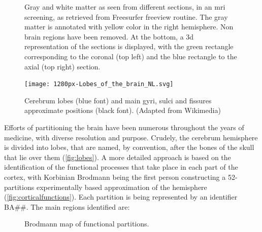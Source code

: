 \begin{figure}[H]
	\begin{minipage}{.5\linewidth}
	\centering
	\end{minipage}%
	\begin{minipage}{.5\linewidth}
	\centering
	\end{minipage}\par\medskip
	\centering
	\caption[\Ac{mri} screening of gray and white matter]{Gray and white matter as seen from different sections, in an \ac{mri} screening, as retrieved from Freesurfer freeview routine. The gray matter is annotated with yellow color in the right hemisphere. Non brain regions have been removed. At the bottom, a \ac{3d} representation of the sections is displayed, with the green rectangle corresponding to the coronal (top left) and the blue rectangle to the axial (top right) section.}
	\label{fig:cerebissection}
\end{figure}



\begin{figure}[H]
	\centering
	\texttt{[image: 1280px-Lobes\_of\_the\_brain\_NL.svg]}
	\caption[A crude cerebrum partitioning]{Cerebrum lobes (blue font) and main gyri, sulci and fissures approximate positions (black font). (Adapted from Wikimedia)}
	\label{fig:lobes}
\end{figure}

Efforts of partitioning the brain have been numerous throughout the years of medicine, with diverse resolution and purpose. Crudely, the cerebrum hemisphere is divided into lobes, that are named, by convention, after the bones of the skull that lie over them (\autoref{fig:lobes}).  A more detailed approach is based on the identification of the functional processes that take place in each part of the cortex, with Korbinian Brodmann being the first person constructing a 52-partitions experimentally based approximation of the hemisphere \cite{Brodmann1909} (\autoref{fig:corticalfunctions}). Each partition is being represented by an identifier BA\#\#. The main regions identified are:

\begin{figure}[H]
	\centering
	\caption{Brodmann map of functional partitions.}
	\label{fig:corticalfunctions}
\end{figure}


